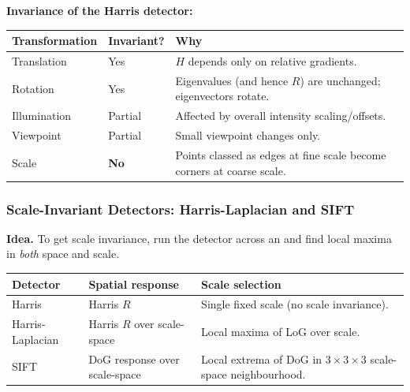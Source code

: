 \textbf{Invariance of the Harris detector:}
\begin{center}
\renewcommand{\arraystretch}{1.3}
\begin{tabular}{@{} l l p{6cm} @{}}
\toprule
\textbf{Transformation} & \textbf{Invariant?} & \textbf{Why} \\
\midrule
Translation & Yes & $H$ depends only on relative gradients. \\
Rotation & Yes & Eigenvalues (and hence $R$) are unchanged; eigenvectors rotate. \\
Illumination & Partial & Affected by overall intensity scaling/offsets. \\
Viewpoint & Partial & Small viewpoint changes only. \\
Scale & \textbf{No} & Points classed as edges at fine scale become corners at coarse scale. \\
\bottomrule
\end{tabular}
\end{center}

\bigseparator

\subsubsection{Scale-Invariant Detectors: Harris-Laplacian and SIFT}

\textbf{Idea.} To get scale invariance, run the detector across an  and find local maxima in \emph{both} space and scale.

\begin{center}
\renewcommand{\arraystretch}{1.3}
\begin{tabular}{@{} l p{4.8cm} p{5.5cm} @{}}
\toprule
\textbf{Detector} & \textbf{Spatial response} & \textbf{Scale selection} \\
\midrule
Harris & Harris $R$ & Single fixed scale (no scale invariance). \\
Harris-Laplacian & Harris $R$ over scale-space & Local maxima of LoG over scale. \\
SIFT & DoG response over scale-space & Local extrema of DoG in $3\times 3 \times 3$ scale-space neighbourhood. \\
\bottomrule
\end{tabular}
\end{center}

\separator

